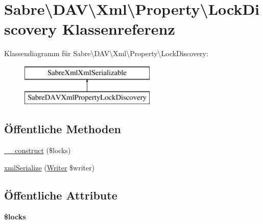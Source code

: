 \hypertarget{class_sabre_1_1_d_a_v_1_1_xml_1_1_property_1_1_lock_discovery}{}\section{Sabre\textbackslash{}D\+AV\textbackslash{}Xml\textbackslash{}Property\textbackslash{}Lock\+Discovery Klassenreferenz}
\label{class_sabre_1_1_d_a_v_1_1_xml_1_1_property_1_1_lock_discovery}
Klassendiagramm für Sabre\textbackslash{}D\+AV\textbackslash{}Xml\textbackslash{}Property\textbackslash{}Lock\+Discovery\+:\begin{figure}[H]
\begin{center}
\leavevmode
\includegraphics[height=2.000000cm]{class_sabre_1_1_d_a_v_1_1_xml_1_1_property_1_1_lock_discovery}
\end{center}
\end{figure}
\subsection*{Öffentliche Methoden}
\begin{DoxyCompactItemize}
\item 
\mbox{\hyperlink{class_sabre_1_1_d_a_v_1_1_xml_1_1_property_1_1_lock_discovery_aae6b209df18e7a91fa468059c8b8274d}{\+\_\+\+\_\+construct}} (\$locks)
\item 
\mbox{\hyperlink{class_sabre_1_1_d_a_v_1_1_xml_1_1_property_1_1_lock_discovery_a607122756acce92e3d2bc23ca99ef505}{xml\+Serialize}} (\mbox{\hyperlink{class_sabre_1_1_xml_1_1_writer}{Writer}} \$writer)
\end{DoxyCompactItemize}
\subsection*{Öffentliche Attribute}
\begin{DoxyCompactItemize}
\item 
\mbox{\label{class_sabre_1_1_d_a_v_1_1_xml_1_1_property_1_1_lock_discovery_a1b4e69d92069764c52f5b6a29f079387}} 
{\bfseries \$locks}
\end{DoxyCompactItemize}
